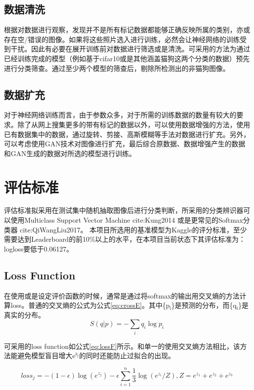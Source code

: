 \documentclass[a4paper,11pt]{article}
\begin{document}
\subsection{数据清洗}
\label{sec-3-2}
根据对数据进行观察，发现并不是所有标记数据都能够正确反映所属的类别，亦或存在空/错误的图像。如果将这些照片选入进行训练，必然会让神经网络的训练受到干扰。因此有必要在展开训练前对数据进行筛选或是清洗。可采用的方法为通过已经训练完成的模型（例如基于cifar10或是其他涵盖猫狗这两个分类的数据）预先进行分类筛查。通过至少两个模型的筛查后，剔除所检测出的非猫狗图像。

\subsection{数据扩充}
\label{sec-3-3}
对于神经网络训练而言，由于参数众多，对于所需的训练数据的数量有较大的要求。除了从网上搜集更多的带有标记的数据以外，可以使用数据增强的方法，使用已有数据集中的数据，通过旋转、剪接、高斯模糊等手法对数据进行扩充。另外，可以考虑使用GAN技术对图像进行扩充，最后综合原数据、数据增强产生的数据和GAN生成的数据对所选的模型进行训练。

\section{评估标准}
\label{sec-4}
评估标准拟采用在测试集中随机抽取图像后进行分类判断，所采用的分类辨识器可以使用Multiclass Support Vector Machine cite:Kung2014 或是更常见的Softmax分类器 cite:QiWangLiu2017。 本项目所选用的基准模型为Kaggle的评分标准，至少需要达到Leaderboard的前10\%以上的水平，在本项目当前状态下其评估标准为：logloss要低于0.06127。

\subsection{Loss Function}
\label{sec-4-1}
在使用或是设定评价函数的时候，通常是通过将softmax的输出用交叉熵的方法计算loss。普通的交叉熵的公式为公式\ref{eq:crossE}。其中\{p$_{\text{i}}$\}是预测的分布，而\{q$_{\text{i}}$\}是真实的分布。
\begin{equation}
\label{eq:crossE}
S(q|p) = -\sum_i q_i \log{p_i}
\end{equation}

可采用的loss function如公式\ref{eq:lossF}所示。和单一的使用交叉熵方法相比，该方法能避免模型盲目增大e$^{\text{z}_{\text{j}}}$的同时还能防止过拟合的出现。

\begin{equation}
\label{eq:lossF}
loss_j = - (1-\epsilon)\log{(e^{z_j})} - \epsilon \sum_{i=1}^n \frac{1}{3} \log{(e^{z_i}/Z)}, Z=e^{z_1}+ e^{z_2}+e^{z_3}
\end{equation}
\end{document}
